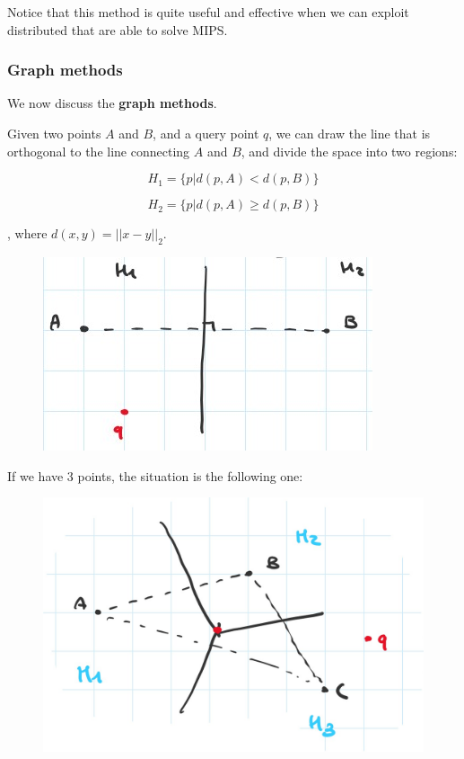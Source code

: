 Notice that this method is quite useful and effective when we can exploit distributed that are able to solve MIPS.

\subsubsection{Graph methods}
We now discuss the \textbf{graph methods}. 

Given two points $A$ and $B$, and a query point $q$, we can draw the line that is orthogonal to the line connecting $A$ and $B$, and divide the space into two regions:

$$
H_1 = \{ p | d(p,A) < d(p,B) \}
$$

$$
H_2 = \{ p | d(p,A) \geq d(p,B) \}
$$

, where $d(x,y) = ||x-y||_2$.

\begin{figure}[h!]
		\centering
		\includegraphics[scale = 1.6]{img/voronoi 1.jpg}
        \label{voronoi1}
\end{figure}

If we have 3 points, the situation is the following one:

\begin{figure}[h!]
		\centering
		\includegraphics[scale = 0.6]{img/voronoi 2.jpg}
        \label{voronoi2}
\end{figure}

